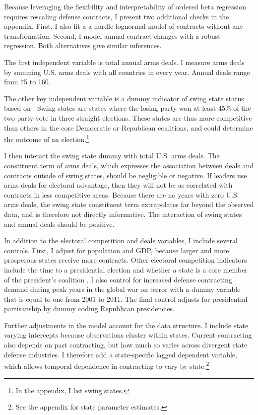 \documentclass[12pt]{article}
\begin{document}
Because leveraging the flexibility and interpretability of ordered beta regression requires rescaling defense contracts, I present two additional checks in the appendix. 
First, I also fit a a hurdle lognormal model of contracts without any transformation.
Second, I model annual contract changes with a robust regression. 
Both alternatives give similar inferences.


The first independent variable is total annual arms deals.  
I measure arms deals by summing U.S. arms deals with all countries in every year. 
Annual deals range from 75 to 160. 


The other key independent variable is a dummy indicator of swing state status based on \citet{KrinerReeves2015}.
Swing states are states where the losing party won at least 45\% of the two-party vote in three straight elections.
These states are thus more competitive than others in the core Democratic or Republican coalitions, and could determine the outcome of an election.\footnote{In the appendix, I list swing states.}
%
%
%


I then interact the swing state dummy with total U.S. arms deals. 
The constituent term of arms deals, which expresses the association between deals and contracts outside of swing states, should be negligible or negative.
If leaders use arms deals for electoral advantage, then they will not be as correlated with contracts in less competitive areas. 
Because there are no years with zero U.S. arms deals, the swing state constituent term extrapolates far beyond the observed data, and is therefore not directly informative. 
The interaction of swing states and annual deals should be positive.


In addition to the electoral competition and deals variables, I include several controls. 
First, I adjust for population and GDP, because larger and more prosperous states receive more contracts. 
Other electoral competition indicators include the time to a presidential election and whether a state is a core member of the president's coalition \citep{KrinerReeves2015}. 
I also control for increased defense contracting demand during peak years in the global war on terror with a dummy variable that is equal to one from 2001 to 2011. 
The final control adjusts for presidential partisanship by dummy coding Republican presidencies. 


Further adjustments in the model account for the data structure.
I include state varying intercepts because observations cluster within states. 
Current contracting also depends on past contracting, but how much so varies across divergent state defense industries. 
I therefore add a state-specific lagged dependent variable, which allows temporal dependence in contracting to vary by state.\footnote{See the appendix for state parameter estimates.}
\end{document}
